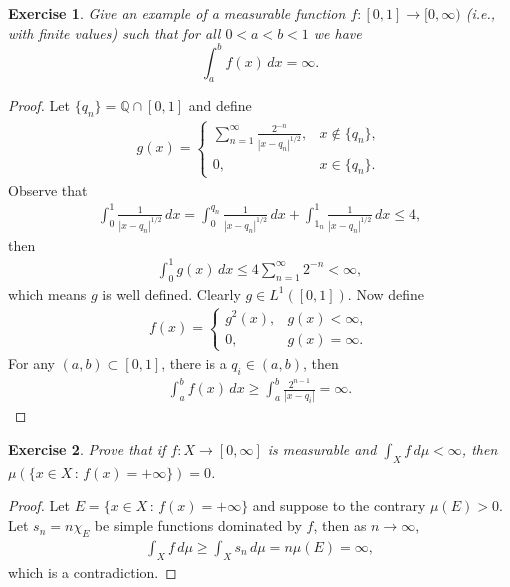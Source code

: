 \documentclass[11pt]{book}
\newtheorem{exercise}{Exercise}[section]
\theoremstyle{definition}
\numberwithin{equation}{chapter}
\begin{document}
\begin{exercise}
Give an example of a measurable function $f:[0,1]\to [0,\infty)$ (i.e., with finite values) such that for all $0<a<b<1$ we have
$$
\int_a^b f(x)\, dx = \infty.
$$
\end{exercise}
\begin{proof} 
Let $\{q_n\} = \mathbb{Q} \cap [0,1]$ and define
\begin{align*}
    g(x) = \begin{cases}
        \sum^\infty_{n=1} \frac{2^{-n}}{|x - q_n|^{1/2}}, & x \notin \{q_n\}, \\
        0, & x \in \{q_n\}.
    \end{cases}
\end{align*}
Observe that
\begin{align*}
    \int^1_0 \frac{1}{|x - q_n|^{1/2}}\, dx = \int^{q_n}_0 \frac{1}{|x - q_n|^{1/2}}\, dx + \int^1_{1_n} \frac{1}{|x - q_n|^{1/2}}\, dx \leq 4,
\end{align*}
then
\begin{align*}
    \int^1_0 g(x)\,dx \leq 4 \sum^\infty_{n=1} 2^{-n} < \infty,
\end{align*}
which means $g$ is well defined. Clearly $g \in L^1([0,1])$. Now define
\begin{align*}
    f(x) = \begin{cases}
        g^2(x), & g(x) < \infty, \\
        0, & g(x) = \infty.
    \end{cases}
\end{align*}
For any $(a,b) \subset [0,1]$, there is a $q_i \in (a,b)$, then
\begin{align*}
    \int^b_a f(x)\,dx \geq \int^b_a \frac{2^{n-1}}{|x - q_i|} =  \infty.
\end{align*}
\end{proof}

\medskip

\begin{exercise}
Prove that if $f:X\to [0,\infty]$ is measurable and $\int_Xf\,d\mu<\infty$, then
$\mu(\{x \in X \,:\, f(x) = +\infty\})=0$.
\end{exercise}
\begin{proof} 
Let $E = \{x \in X \,:\, f(x)=+\infty\}$ and suppose to the contrary $\mu(E) > 0$. Let $s_n = n \chi_E$ be simple functions dominated by $f$, then as $n \to \infty$,
\begin{align*}
    \int_X f\,d\mu \geq \int_X s_n\,d\mu = n \mu(E) = \infty,
\end{align*}
which is a contradiction.
\end{proof}
\end{document}
